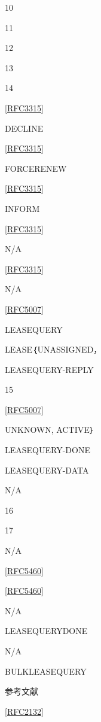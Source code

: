 10

11

12

13

14

\href{https://www.rfc-editor.org/rfc/rfc3315}{\href{https://www.rfc-editor.org/rfc/rfc3315}{[RFC3315]}}

DECLINE

\href{https://www.rfc-editor.org/rfc/rfc3315}{\href{https://www.rfc-editor.org/rfc/rfc3315}{[RFC3315]}}

FORCERENEW

\href{https://www.rfc-editor.org/rfc/rfc3315}{\href{https://www.rfc-editor.org/rfc/rfc3315}{[RFC3315]}}

INFORM

\href{https://www.rfc-editor.org/rfc/rfc3315}{\href{https://www.rfc-editor.org/rfc/rfc3315}{[RFC3315]}}

N/A

\href{https://www.rfc-editor.org/rfc/rfc3315}{\href{https://www.rfc-editor.org/rfc/rfc3315}{[RFC3315]}}

N/A

\href{https://www.rfc-editor.org/rfc/rfc5007}{\href{https://www.rfc-editor.org/rfc/rfc5007}{[RFC5007]}}

LEASEQUERY

LEASE｛UNASSIGNED，

LEASEQUERY-REPLY

15

\href{https://www.rfc-editor.org/rfc/rfc5007}{\href{https://www.rfc-editor.org/rfc/rfc5007}{[RFC5007]}}

UNKNOWN, ACTIVE｝

LEASEQUERY-DONE

LEASEQUERY-DATA

N/A

16

17

N/A

\href{https://www.rfc-editor.org/rfc/rfc5460}{\href{https://www.rfc-editor.org/rfc/rfc5460}{[RFC5460]}}

\href{https://www.rfc-editor.org/rfc/rfc5460}{\href{https://www.rfc-editor.org/rfc/rfc5460}{[RFC5460]}}

N/A

LEASEQUERYDONE

N/A

BULKLEASEQUERY

参考文献

\href{https://www.rfc-editor.org/rfc/rfc2132}{\href{https://www.rfc-editor.org/rfc/rfc2132}{[RFC2132]}}

